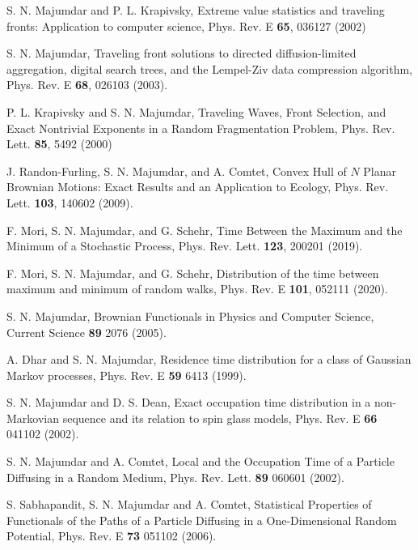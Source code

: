 \documentclass[showpacs,amsmath,amssymb,aps,pre,twocolumn,]{revtex4-1}
\begin{document}
\begin{thebibliography}{}
S. N. Majumdar and P. L. Krapivsky, Extreme value statistics
and traveling fronts: Application to computer science, Phys.
Rev. E \textbf{65}, 036127 (2002)

S. N. Majumdar, Traveling front solutions to directed
diffusion-limited aggregation, digital search trees, and the
Lempel-Ziv data compression algorithm, Phys. Rev. E \textbf{68},
026103 (2003).

P. L. Krapivsky and S. N. Majumdar, Traveling Waves, Front
Selection, and Exact Nontrivial Exponents in a Random Fragmentation Problem, Phys. Rev. Lett. \textbf{85}, 5492 (2000)



J. Randon-Furling, S. N. Majumdar, and A. Comtet, Convex Hull of $N$ Planar Brownian Motions: Exact Results and
an Application to Ecology, Phys. Rev. Lett. \textbf{103}, 140602
(2009).

F. Mori, S. N. Majumdar, and G. Schehr, Time Between the
Maximum and the Minimum of a Stochastic Process, Phys.
Rev. Lett. \textbf{123}, 200201 (2019).

 F. Mori, S. N. Majumdar, and G. Schehr, Distribution of the
time between maximum and minimum of random walks, Phys.
Rev. E \textbf{101}, 052111 (2020).






S. N. Majumdar, Brownian Functionals in Physics and Computer Science, Current Science \textbf{89} 2076 (2005). 

A. Dhar  and S. N. Majumdar, Residence time distribution for a class of Gaussian Markov processes, {Phys. Rev. E} \textbf{59} 6413 (1999).


S. N. Majumdar and D. S. Dean, Exact occupation time distribution in a non-Markovian sequence and its relation to spin glass models, {Phys. Rev. E} \textbf{66} 041102 (2002).



S. N. Majumdar and A. Comtet, Local and the Occupation Time of a Particle Diffusing in a Random Medium, {Phys. Rev. Lett.} \textbf{89} 060601 (2002).

S. Sabhapandit, S. N.  Majumdar and A. Comtet, Statistical Properties
of Functionals of the Paths of a Particle Diffusing in a One-Dimensional
Random Potential, {Phys. Rev. E} \textbf{73} 051102 (2006).



\end{thebibliography}
\end{document}
